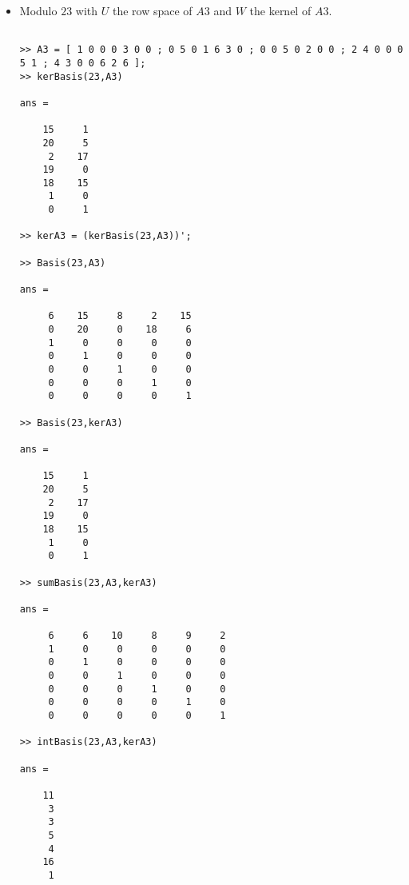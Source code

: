 \documentclass[11pt]{article}
\begin{document}
\begin{itemize}
\begin{verbatim}
ans =

    13    18
    16     5
     3    10
     0    11
     2    13
     1     0
     0     1

>> sumBasis(19,A3,kerA3)

ans =

     1     0     0     0     0     0     0
     0     1     0     0     0     0     0
     0     0     1     0     0     0     0
     0     0     0     1     0     0     0
     0     0     0     0     1     0     0
     0     0     0     0     0     1     0
     0     0     0     0     0     0     1

>> intBasis(19,A3,kerA3)

ans =

  7×0 empty double matrix
\end{verbatim}

\item Modulo $23$ with $U$ the row space of $A3$ and $W$ the kernel of $A3$.

\begin{verbatim}

>> A3 = [ 1 0 0 0 3 0 0 ; 0 5 0 1 6 3 0 ; 0 0 5 0 2 0 0 ; 2 4 0 0 0 5 1 ; 4 3 0 0 6 2 6 ];
>> kerBasis(23,A3)

ans =

    15     1
    20     5
     2    17
    19     0
    18    15
     1     0
     0     1

>> kerA3 = (kerBasis(23,A3))';

>> Basis(23,A3)

ans =

     6    15     8     2    15
     0    20     0    18     6
     1     0     0     0     0
     0     1     0     0     0
     0     0     1     0     0
     0     0     0     1     0
     0     0     0     0     1

>> Basis(23,kerA3)

ans =

    15     1
    20     5
     2    17
    19     0
    18    15
     1     0
     0     1

>> sumBasis(23,A3,kerA3)

ans =

     6     6    10     8     9     2
     1     0     0     0     0     0
     0     1     0     0     0     0
     0     0     1     0     0     0
     0     0     0     1     0     0
     0     0     0     0     1     0
     0     0     0     0     0     1

>> intBasis(23,A3,kerA3)

ans =

    11
     3
     3
     5
     4
    16
     1

\end{verbatim}

\end{itemize}
\end{document}
